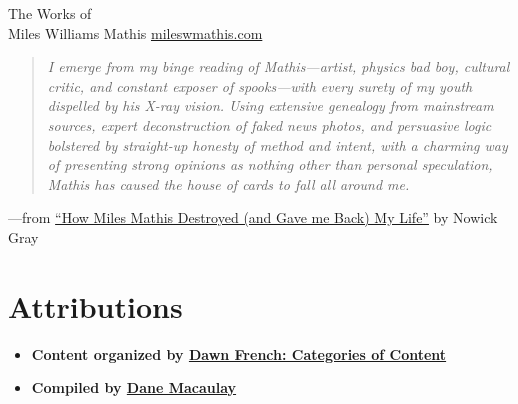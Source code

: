 \documentclass{article}
\begin{document}
\begin{titlepage}
    \centering
    \vfill
    {\fontsize{50pt}{60pt}\selectfont The Works of \\[1ex] Miles Williams Mathis}
    \vfill
    {\Large \href{http://mileswmathis.com}{mileswmathis.com}}
    \vfill
\end{titlepage}

\newpage
\thispagestyle{empty}
\vspace*{\fill}

\begin{quote}
\centering
\textit{I emerge from my binge reading of Mathis—artist, physics bad boy, cultural critic, and constant exposer of spooks—with every surety of my youth dispelled by his X-ray vision. Using extensive genealogy from mainstream sources, expert deconstruction of faked news photos, and persuasive logic bolstered by straight-up honesty of method and intent, with a charming way of presenting strong opinions as nothing other than personal speculation, Mathis has caused the house of cards to fall all around me.}
\end{quote}

\centering —from \href{https://nowickgray.com/last-curtain-miles-mathis/}{“How Miles Mathis Destroyed (and Gave me Back) My Life”}
\centering by Nowick Gray

\vspace*{\fill}





\newpage
\section*{Attributions}

\begin{itemize}
  \item \textbf{Content organized by \href{https://theresearchofmilesmathis.substack.com/p/categories-of-content}{Dawn French: Categories of Content}}
  \item \textbf{Compiled by \href{mailto:dane.macaulay@gmail.com}{Dane Macaulay}}
\end{itemize}
\end{document}
